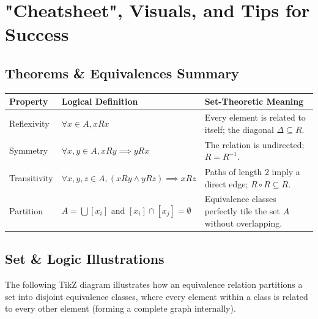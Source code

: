 \documentclass[11pt, a4paper]{article}
\theoremstyle{definition}
\theoremstyle{remark}
\begin{document}
\newpage

\section{"Cheatsheet", Visuals, and Tips for Success}

\subsection{Theorems \& Equivalences Summary}
\renewcommand{\arraystretch}{1.5}
\begin{tabularx}{\textwidth}{l X X}
\toprule
\textbf{Property} & \textbf{Logical Definition} & \textbf{Set-Theoretic Meaning} \\
\midrule
Reflexivity & $\displaystyle \forall x \in A, xRx$ & Every element is related to itself; the diagonal $\Delta \subseteq R$. \\
\addlinespace[4pt]
Symmetry & $\displaystyle \forall x, y \in A, xRy \implies yRx$ & The relation is undirected; $R = R^{-1}$. \\
\addlinespace[4pt]
Transitivity & $\displaystyle \forall x, y, z \in A, (xRy \land yRz) \implies xRz$ & Paths of length 2 imply a direct edge; $R \circ R \subseteq R$. \\
\addlinespace[4pt]
Partition & $\displaystyle A = \bigcup [x_i] \text{ and } [x_i] \cap [x_j] = \emptyset$ & Equivalence classes perfectly tile the set $A$ without overlapping. \\
\bottomrule
\end{tabularx}

\subsection{Set \& Logic Illustrations}
The following TikZ diagram illustrates how an equivalence relation partitions a set into disjoint equivalence classes, where every element within a class is related to every other element (forming a complete graph internally).
\end{document}

